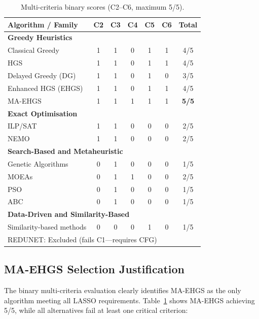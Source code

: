 \begin{appendices}
\begin{table}[H]
  \centering
  \footnotesize
  \caption{Multi-criteria binary scores (C2--C6, maximum 5/5).}
  \label{tab:app-final-scores}
  \begin{tabular}{@{}p{4.5cm}ccccc c@{}}
    \toprule
    \textbf{Algorithm / Family} & \textbf{C2} & \textbf{C3} & \textbf{C4} & \textbf{C5} & \textbf{C6} & \textbf{Total} \\
    \midrule
    \multicolumn{7}{l}{\textbf{Greedy Heuristics}} \\
    Classical Greedy      & 1 & 1 & 0 & 1 & 1 & 4/5 \\
    HGS                   & 1 & 1 & 0 & 1 & 1 & 4/5 \\
    Delayed Greedy (DG)   & 1 & 1 & 0 & 1 & 0 & 3/5 \\
    Enhanced HGS (EHGS)   & 1 & 1 & 0 & 1 & 1 & 4/5 \\
    MA-EHGS               & 1 & 1 & 1 & 1 & 1 & \textbf{5/5} \\[0.2em]
    \multicolumn{7}{l}{\textbf{Exact Optimisation}} \\
    ILP/SAT               & 1 & 1 & 0 & 0 & 0 & 2/5 \\
    NEMO                  & 1 & 1 & 0 & 0 & 0 & 2/5 \\[0.2em]
    \multicolumn{7}{l}{\textbf{Search-Based and Metaheuristic}} \\
    Genetic Algorithms    & 0 & 1 & 0 & 0 & 0 & 1/5 \\
    MOEAs                 & 0 & 1 & 1 & 0 & 0 & 2/5 \\
    PSO                   & 0 & 1 & 0 & 0 & 0 & 1/5 \\
    ABC                   & 0 & 1 & 0 & 0 & 0 & 1/5 \\[0.2em]
    \multicolumn{7}{l}{\textbf{Data-Driven and Similarity-Based}} \\
    Similarity-based methods & 0 & 0 & 0 & 1 & 0 & 1/5 \\
    \midrule
    \multicolumn{7}{l}{REDUNET: Excluded (fails C1—requires CFG)} \\
    \bottomrule
  \end{tabular}
\end{table}

\subsection{MA-EHGS Selection Justification}\label{app:selection}

The binary multi-criteria evaluation clearly identifies MA-EHGS as the only algorithm meeting all LASSO requirements. Table~\ref{tab:app-final-scores} shows MA-EHGS achieving 5/5, while all alternatives fail at least one critical criterion:


\end{appendices}
